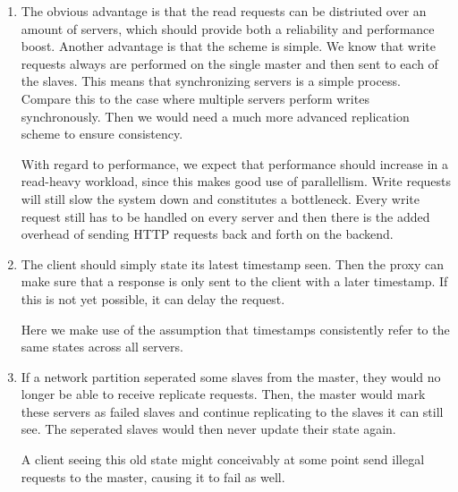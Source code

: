 \documentclass[11pt]{article}
\begin{document}
\begin{enumerate}
  \item
    The obvious advantage is that the read requests can be distriuted over an
    amount of servers, which should provide both a reliability and performance
    boost. Another advantage is that the scheme is simple. We know that write
    requests always are performed on the single master and then sent to each of
    the slaves. This means that synchronizing servers is a simple process.
    Compare this to the case where multiple servers perform writes
    synchronously. Then we would need a much more advanced replication scheme
    to ensure consistency.

    With regard to performance, we expect that performance should increase in a
    read-heavy workload, since this makes good use of parallellism. Write requests
    will still slow the system down and constitutes a bottleneck. Every write request
    still has to be handled on every server and then there is the added
    overhead of sending HTTP requests back and forth on the backend.

  \item
    The client should simply state its latest timestamp seen. Then the proxy
    can make sure that a response is only sent to the client with a later timestamp.
    If this is not yet possible, it can delay the request.

    Here we make use of the assumption that timestamps consistently refer to
    the same states across all servers.

  \item
    If a network partition seperated some slaves from the master, they would no longer
    be able to receive replicate requests. Then, the master would mark these servers as
    failed slaves and continue replicating to the slaves it can still see. The seperated
    slaves would then never update their state again.

    A client seeing this old state might conceivably at some point send illegal requests
    to the master, causing it to fail as well.

\end{enumerate}
\end{document}
